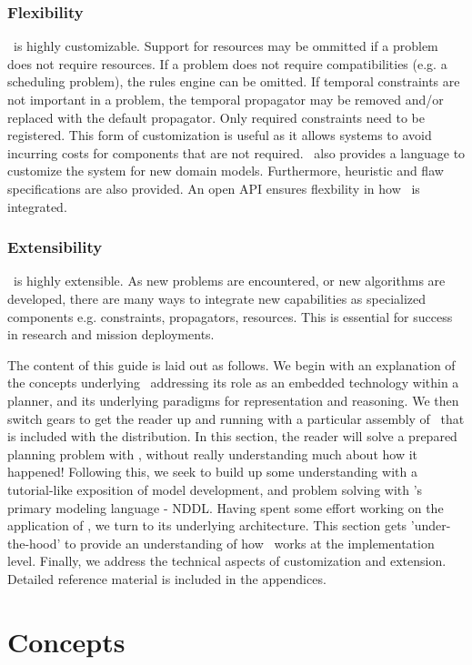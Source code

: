 \documentclass[10pt, letterpaper, twoside]{article}
\begin{document}
\subsubsection{Flexibility} \ET\, is highly customizable. Support for
resources may be ommitted if a problem does not require resources. If a 
problem does not require compatibilities (e.g. a scheduling problem), the
rules engine can be omitted. If temporal constraints are not important in a
problem, the temporal propagator may be removed and/or replaced with the
default propagator. Only required constraints need to be registered. This
form of customization is useful as it allows systems to avoid incurring
costs for components that are not required. \ET\, also provides a language to
customize the system for new domain models.  Furthermore, heuristic and flaw
specifications are also provided. An open API ensures flexbility in how \ET\,
is integrated.

\subsubsection{Extensibility} \ET\, is highly extensible. As new problems are
encountered, or new algorithms are developed, there are many ways to
integrate new capabilities as specialized components e.g. constraints,
propagators, resources. This is essential for success in research and
mission deployments. 

The content of this guide is laid out as follows. We begin with an
explanation of the concepts underlying \ET\, addressing its role as
an embedded technology within a planner, and its underlying paradigms
for representation and reasoning. We then switch gears to get the
reader up and running with a particular assembly of \ET\, that is
included with the distribution. In this section, the reader will solve
a prepared planning problem with \ET, without really understanding
much about how it happened! Following this, we seek to build up some
understanding with a tutorial-like exposition of model development,
and problem solving with \ET's primary modeling language -
NDDL. Having spent some effort working on the application of \ET,
we turn to its underlying architecture. This section gets
'under-the-hood' to provide an understanding of how \ET\, works at
the implementation level.  Finally, we address the technical aspects
of customization and extension. Detailed reference material is
included in the appendices.

\section{Concepts}
\end{document}
